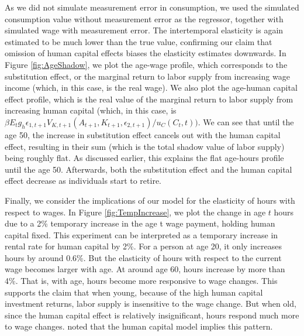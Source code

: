\documentclass{article}
\begin{document}
        As we did not simulate measurement error in consumption, we used the simulated consumption value without measurement error as the regressor, together with simulated wage with measurement error. The intertemporal elasticity is again estimated to be much lower than the true value, confirming our claim that omission of human capital effects biases the elasticity estimates downwards. In Figure \ref{fig:AgeShadow}, we plot the age-wage profile, which corresponds to the substitution effect, or the marginal return to labor supply from increasing wage income (which, in this case, is the real wage). We also plot the age-human capital effect profile, which is the real value of the marginal return to labor supply from increasing human capital (which, in this case, is $\beta E_t g_h \epsilon_{1,t+1} V_{K, t+1}(A_{t+1}, K_{t+1}, \epsilon_{2,t+1})/u_C(C_t, t))$. We can see that until the age 50, the increase in substitution effect cancels out with the human capital effect, resulting in their sum (which is the total shadow value of labor supply) being roughly flat. As discussed earlier, this explains the flat age-hours profile until the age 50. Afterwards, both the substitution effect and the human capital effect decrease as individuals start to retire.\par
        
        
         Finally, we consider the implications of our model for the elasticity of hours with respect to wages. In Figure \ref{fig:TempIncrease}, we plot the change in age $t$ hours due to a 2\% temporary increase in the age t wage payment, holding human capital fixed. This experiment can be interpreted as a temporary increase in rental rate for human capital by 2\%. For a person at age 20, it only increases hours by around 0.6\%. But the elasticity of hours with respect to the current wage becomes larger with age. At around age 60, hours increase by more than 4\%. That is, with age, hours become more responsive to wage changes. This supports the claim that when young, because of the high human capital investment returns, labor supply is insensitive to the wage change. But when old, since the human capital effect is relatively insignificant, hours respond much more to wage changes. \cite{Shaw1989-jb} noted that the human capital model implies this pattern.
\end{document}
